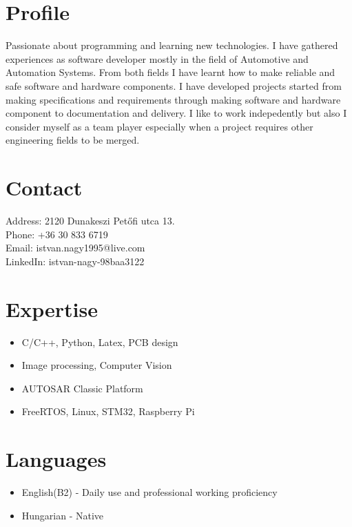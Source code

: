 \documentclass[11pt,oneslide,a4paper,titlepage]{article}
\begin{document}
\begin{tcolorbox}
	\begin{minipage}[t]{8cm}
		\vspace*{-0.5cm}
		\begin{tcolorbox}[grow to left by=0.6cm,colback=gray!25,colframe=white]
			\section*{Profile}
			Passionate about programming and learning new technologies. I have gathered experiences as software developer mostly in the field of Automotive and Automation Systems. From both fields I have learnt how to make reliable and safe software and hardware components. \newline
			I have developed projects started from making specifications and requirements through making software and hardware component to documentation and delivery. \newline
			I like to work indepedently but also I consider myself as a team player especially when a project requires other engineering fields to be merged.

			\section*{Contact}
			Address: 2120 Dunakeszi Petőfi utca 13. \\
			Phone: +36 30 833 6719 \\
			Email: istvan.nagy1995@live.com \\
			LinkedIn: istvan-nagy-98baa3122 \\

			\section*{Expertise}
			\begin{itemize}
				\item{C/C++, Python, Latex, PCB design}
				\item{Image processing, Computer Vision}
				\item{AUTOSAR Classic Platform}
				\item{FreeRTOS, Linux, STM32, Raspberry Pi}
			\end{itemize}
			
			\section*{Languages}
			\begin{itemize}
				\item{English(B2) - Daily use and professional working proficiency}
				\item{Hungarian - Native}
			\end{itemize}
			

\end{tcolorbox}
\end{minipage}
\end{tcolorbox}
\end{document}
